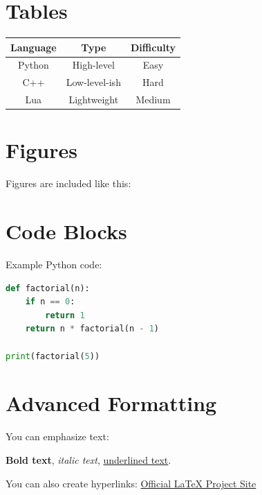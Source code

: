 \documentclass[11pt]{article}
\begin{document}
\section{Tables}

\begin{tabular}{|c|c|c|}
\hline
Language & Type & Difficulty \\
\hline
Python & High-level & Easy \\
C++ & Low-level-ish & Hard \\
Lua & Lightweight & Medium \\
\hline
\end{tabular}

\section{Figures}

Figures are included like this:

\begin{center}
\end{center}

\section{Code Blocks}

Example Python code:

\begin{lstlisting}[language=Python]
def factorial(n):
    if n == 0:
        return 1
    return n * factorial(n - 1)

print(factorial(5))
\end{lstlisting}

\section{Advanced Formatting}

You can emphasize text:

\textbf{Bold text}, \textit{italic text}, \underline{underlined text}.

You can also create hyperlinks:
\href{https://www.latex-project.org}{Official LaTeX Project Site}
\end{document}
